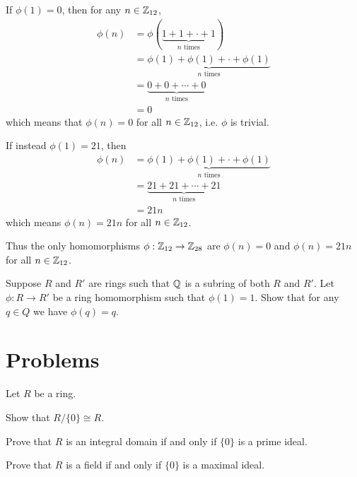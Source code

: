 \begin{example}
    If $\phi(1) = 0$, then for any $n \in \mathbb{Z}_{12}$,
    \begin{align*}
        \phi(n) &= \phi(\underbrace{1 + 1 + \cdot + 1}_{n \text{ times}})\\
        &= \underbrace{\phi(1) + \phi(1) + \cdot + \phi(1)}_{n \text{ times}}\\
        &= \underbrace{0 + 0 + \cdots + 0}_{n \text{ times}}\\
        &= 0
    \end{align*}
    which means that $\phi(n) = 0$ for all $n \in \mathbb{Z}_{12}$, i.e. $\phi$ is trivial.

    If instead $\phi(1) = 21$, then
    \begin{align*}
        \phi(n) &= \underbrace{\phi(1) + \phi(1) + \cdot + \phi(1)}_{n \text{ times}}\\
        &= \underbrace{21 + 21 + \cdots + 21}_{n \text{ times}}\\
        &= 21n
    \end{align*}
    which means $\phi(n) = 21n$ for all $n \in \mathbb{Z}_{12}$.

    Thus the only homomorphisms $\phi: \mathbb{Z}_{12} \to \mathbb{Z}_{28}$ are $\phi(n) = 0$ and $\phi(n) = 21n$ for all $n \in \mathbb{Z}_{12}$.
\end{example}

\begin{exercise}\label{exercise-homomorphism-over-Q-fixes-elements-of-Q}
    Suppose $R$ and $R'$ are rings such that $\mathbb{Q}$ is a subring of both $R$ and $R'$. Let $\phi: R \to R'$ be a ring homomorphism such that $\phi(1) = 1$. Show that for any $q \in Q$ we have $\phi(q) = q$.
\end{exercise}

\newpage

\section{Problems}
\begin{problem}
    Let $R$ be a ring.
    \begin{partquestions}{\roman*}
        \item Show that $R/\{0\} \cong R$.
        \item Prove that $R$ is an integral domain if and only if $\{0\}$ is a prime ideal.
        \item Prove that $R$ is a field if and only if $\{0\}$ is a maximal ideal.
    \end{partquestions}
\end{problem}


